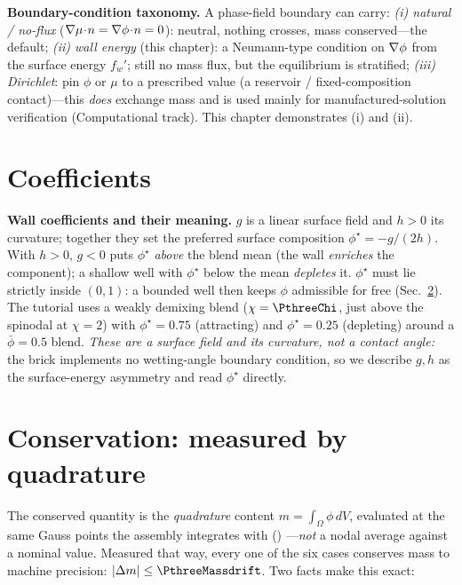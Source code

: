\begin{keybox}
\textbf{Boundary-condition taxonomy.} A phase-field boundary can carry:
\emph{(i) natural / no-flux} ($\nabla\mu\!\cdot\!n=\nabla\phi\!\cdot\!n=0$):
neutral, nothing crosses, mass conserved---the default;
\emph{(ii) wall energy} (this chapter): a Neumann-type condition on
$\nabla\phi$ from the surface energy $f_w'$; still no mass flux, but the
equilibrium is stratified;
\emph{(iii) Dirichlet}: pin $\phi$ or $\mu$ to a prescribed value (a
reservoir / fixed-composition contact)---this \emph{does} exchange mass
and is used mainly for manufactured-solution verification (Computational
track). This chapter demonstrates (i) and (ii).
\end{keybox}

\section{Coefficients}

\begin{keybox}
\textbf{Wall coefficients and their meaning.} $g$ is a linear surface
field and $h>0$ its curvature; together they set the preferred surface
composition $\phi^\star=-g/(2h)$. With $h>0$, $g<0$ puts $\phi^\star$
\emph{above} the blend mean (the wall \emph{enriches} the component); a
shallow well with $\phi^\star$ below the mean \emph{depletes} it.
$\phi^\star$ must lie strictly inside $(0,1)$: a bounded well then keeps
$\phi$ admissible for free (Sec.~\ref{sec:p3cons}). The tutorial uses a
weakly demixing blend ($\chi=\PthreeChi$, just above the spinodal at
$\chi=2$) with $\phi^\star=0.75$ (attracting) and $\phi^\star=0.25$
(depleting) around a $\bar\phi=0.5$ blend.
\emph{These are a surface field and its curvature, not a contact angle:}
the brick implements no wetting-angle boundary condition, so we describe
$g,h$ as the surface-energy asymmetry and read $\phi^\star$ directly.
\end{keybox}

\section{Conservation: measured by quadrature}
\label{sec:p3cons}

The conserved quantity is the \emph{quadrature} content
$m=\int_\Omega\phi\,dV$, evaluated at the same Gauss points the assembly
integrates with ()
---\emph{not} a nodal average against a nominal value. Measured that way,
every one of the six cases conserves mass to machine precision:
$|\Delta m|\le\PthreeMassdrift$. Two facts make this exact:

